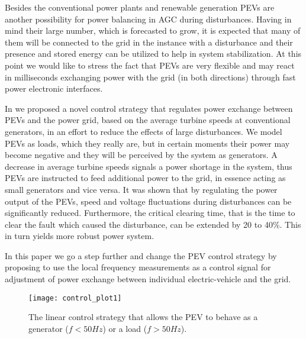 \documentclass[final,12pt]{elsarticle}
\begin{document}
Besides the conventional power plants and renewable generation PEVs are another
possibility for power balancing in AGC during disturbances. Having
in mind their large number, which is forecasted to grow, it is expected that many
of them will be connected to the grid in the instance with a disturbance and
their presence and stored energy can be utilized to help in system
stabilization. At this point we would like to stress the fact that PEVs are very
flexible and may react in milliseconds exchanging power with the grid (in both
directions) through fast power electronic interfaces.

In \cite{gajduk2014improving} we proposed a novel control strategy that regulates power
exchange between PEVs and the power grid, based on the average turbine speeds at
conventional generators, in an effort to reduce the effects of large
disturbances. We model PEVs as loads, which they really are, but in certain
moments their power may become negative and they will be perceived by the system
as generators. A decrease in average turbine speeds signals a power shortage in
the system, thus PEVs are instructed to feed additional power to the grid, in
essence acting as small generators and vice versa. It was shown that by
regulating the power output of the PEVs, speed and voltage fluctuations during
disturbances can be significantly reduced. Furthermore, the critical clearing
time, that is the time to clear the fault which caused the disturbance, can be
extended by 20 to 40\%. This in turn yields more robust power system.

In this paper we go a step further and change the PEV control strategy by
proposing to use the local frequency measurements as a control signal for
adjustment of power exchange between individual electric-vehicle and the grid.

\begin{figure}[!htb]
\centering
\texttt{[image: control\_plot1]}
\caption{The linear control strategy that
allows the PEV to behave as a generator ($f < 50 Hz$) or a load ($f > 50 Hz$).}
\label{fig:control_plot}
\end{figure}
\end{document}
